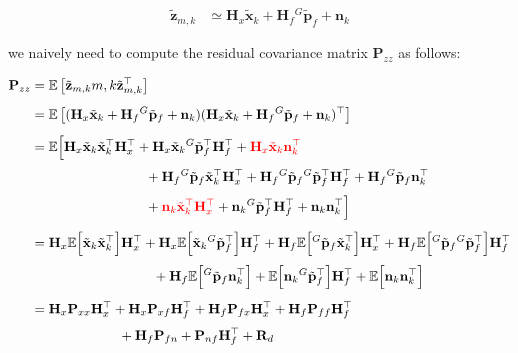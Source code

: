 \begin{align*} \tilde{\mathbf{z}}_{m,k} &\simeq \mathbf{H}_{x} \tilde{\mathbf{x}}_{k} + \mathbf{H}_{f} {}^G\tilde{\mathbf{p}}_f + \mathbf{n}_k \end{align*}

we naively need to compute the residual covariance matrix $\mathbf{P}_{zz}$ as follows\+:

\begin{align*} \mathbf{P}_{zz} &= \mathbb{E}\left[ \tilde{\mathbf{z}}_{m,k}{m,k} \tilde{\mathbf{z}}_{m,k}^\top \right] \\[5px] &= \mathbb{E}\left[ (\mathbf{H}_{x}\tilde{\mathbf{x}}_{k}+\mathbf{H}_{f}{}^G\tilde{\mathbf{p}}_f+\mathbf{n}_k) (\mathbf{H}_{x}\tilde{\mathbf{x}}_{k}+\mathbf{H}_{f}{}^G\tilde{\mathbf{p}}_f+\mathbf{n}_k)^\top \right] \\[5px] &= \mathbb{E}\Big[ \mathbf{H}_{x}\tilde{\mathbf{x}}_{k}\tilde{\mathbf{x}}_{k}^\top\mathbf{H}_{x}^\top +\mathbf{H}_{x}\tilde{\mathbf{x}}_{k}{}^G\tilde{\mathbf{p}}_f^\top\mathbf{H}_{f}^\top +\textcolor{red}{\mathbf{H}_{x}\tilde{\mathbf{x}}_{k}\mathbf{n}_k^\top} \nonumber\\[3px] &\hspace{3cm}+ \mathbf{H}_{f}{}^G\tilde{\mathbf{p}}_f\tilde{\mathbf{x}}_{k}^\top\mathbf{H}_{x}^\top +\mathbf{H}_{f}{}^G\tilde{\mathbf{p}}_f{}^G\tilde{\mathbf{p}}_f^\top\mathbf{H}_{f}^\top +\mathbf{H}_{f}{}^G\tilde{\mathbf{p}}_f\mathbf{n}_k^\top \nonumber\\[3px] &\hspace{3cm}+ \textcolor{red}{\mathbf{n}_k\tilde{\mathbf{x}}_{k}^\top\mathbf{H}_{x}^\top} +\mathbf{n}_k{}^G\tilde{\mathbf{p}}_f^\top\mathbf{H}_{f}^\top +\mathbf{n}_k\mathbf{n}_k^\top \Big] \\[5px] \empty &= \mathbf{H}_x\mathbb{E}\Big[\tilde{\mathbf{x}}_{k}\tilde{\mathbf{x}}_{k}^\top\Big]\mathbf{H}_x^\top +\mathbf{H}_x\mathbb{E}\Big[\tilde{\mathbf{x}}_{k}{}^G\tilde{\mathbf{p}}_f^\top\Big]\mathbf{H}_f^\top +\mathbf{H}_f\mathbb{E}\Big[{}^G\tilde{\mathbf{p}}_f\tilde{\mathbf{x}}_{k}^\top\Big]\mathbf{H}_x^\top + \mathbf{H}_f\mathbb{E}\Big[{}^G\tilde{\mathbf{p}}_f{}^G\tilde{\mathbf{p}}_f^\top\Big]\mathbf{H}_f^\top \nonumber\\[3px] &\hspace{3.2cm}+ \mathbf{H}_f\mathbb{E}\Big[{}^G\tilde{\mathbf{p}}_f\mathbf{n}_k^\top\Big] +\mathbb{E}\Big[\mathbf{n}_k{}^G\tilde{\mathbf{p}}_f^\top\Big]\mathbf{H}_f^\top +\mathbb{E}\Big[\mathbf{n}_k\mathbf{n}_k^\top\Big] \\[5px] \empty &= \mathbf{H}_x \mathbf{P}_{xx}\mathbf{H}_x^\top +\mathbf{H}_x \mathbf{P}_{xf}\mathbf{H}_f^\top +\mathbf{H}_f \mathbf{P}_{fx}\mathbf{H}_x^\top + \mathbf{H}_f \mathbf{P}_{ff}\mathbf{H}_f^\top \nonumber\\[3px] &\hspace{2.3cm}+ \mathbf{H}_f \mathbf{P}_{fn} +\mathbf{P}_{nf} \mathbf{H}_f^\top +\mathbf{R}_d \end{align*}

